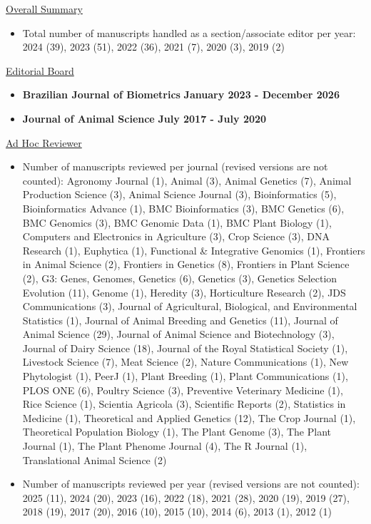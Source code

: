 \documentclass[margin,line,10pt]{res}
\begin{document}
\begin{resume}
\underline{Overall Summary}
 \vspace{.2cm}
\begin{itemize}
\item Total number of manuscripts handled as a section/associate editor per year: 2024 (39), 2023 (51), 2022 (36), 2021 (7), 2020 (3), 2019 (2) 
\end{itemize}


\vspace{0.3cm}


\underline{Editorial Board}
 \vspace{.2cm}
\begin{itemize}
    \item {\bf Brazilian Journal of Biometrics} \hfill {\bf January 2023 - December 2026}
    \item {\bf Journal of Animal Science} \hfill  {\bf July 2017 - July 2020} 
\end{itemize}





\vspace{0.3cm}
\underline{Ad Hoc Reviewer}
\begin{itemize}
    \vspace{.1cm}
\item  Number of manuscripts reviewed per journal (revised versions are not counted): Agronomy Journal (1), Animal (3), Animal Genetics (7), Animal Production Science (3), Animal Science Journal (3), Bioinformatics (5), Bioinformatics Advance (1), BMC Bioinformatics (3), BMC Genetics (6), BMC Genomics (3), BMC Genomic Data (1), BMC Plant Biology (1), Computers and Electronics in Agriculture (3), Crop Science (3), DNA Research (1),  Euphytica (1), Functional \& Integrative Genomics (1), Frontiers in Animal Science (2), Frontiers in Genetics (8), Frontiers in Plant Science (2), G3: Genes, Genomes, Genetics (6), Genetics (3), Genetics Selection Evolution (11), Genome (1), Heredity (3), Horticulture Research (2), JDS Communications (3), Journal of Agricultural, Biological, and Environmental Statistics (1), Journal of Animal Breeding and Genetics (11), Journal of Animal Science (29), Journal of Animal Science and Biotechnology (3), Journal of Dairy Science (18), Journal of the Royal Statistical Society (1), Livestock Science (7), Meat Science (2), Nature Communications (1), New Phytologist (1), PeerJ (1), Plant Breeding (1), Plant Communications (1), PLOS ONE (6), Poultry Science (3), Preventive Veterinary Medicine (1), Rice Science (1), Scientia Agricola (3), Scientific Reports (2), Statistics in Medicine (1), Theoretical and Applied Genetics (12), The Crop Journal (1), Theoretical Population Biology (1), The Plant Genome (3), The Plant Journal (1), The Plant Phenome Journal (4), The R Journal (1), Translational Animal Science (2)  
  \vspace{.1cm}
  \item Number of manuscripts reviewed per year (revised versions are not counted): 2025 (11), 2024 (20), 2023 (16), 2022 (18), 2021 (28), 2020 (19), 2019 (27), 2018 (19), 2017 (20), 2016 (10), 2015 (10), 2014 (6), 2013 (1), 2012 (1)
\end{itemize}




\end{resume}
\end{document}
